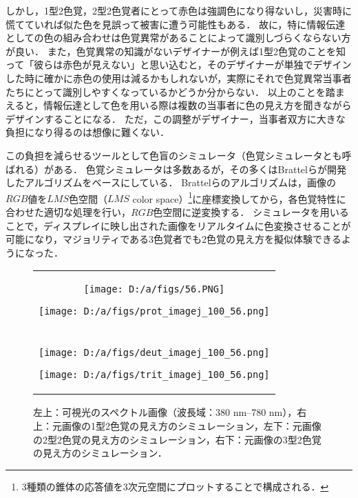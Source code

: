 \documentclass[uplatex,paper=a4,fontsize=4.0truemm,jafontsize=4.0truemm,head_space=30.0truemm,foot_space=30.0truemm,baselineskip=8.0truemm,line_length=40zw,gutter=25.0truemm,oneside,openany,fleqn,hanging_panctuation,open_bracket_pos=nibu_tentsuki,dvipdfmx,jis2004,book,titlepage]{jlreq}
\theoremstyle{mystyle}
\newcommand{\captiondot}[1]{\caption{#1．}}
\newcommand{\mathdisplaystyle}[1]{\(\displaystyle{#1}\)}
\begin{document}
			しかし，1型2色覚，2型2色覚者にとって赤色は強調色になり得ないし，災害時に慌てていれば似た色を見誤って被害に遭う可能性もある．
			故に，特に情報伝達としての色の組み合わせは色覚異常があることによって識別しづらくならない方が良い．
			また，色覚異常の知識がないデザイナーが例えば1型2色覚のことを知って「彼らは赤色が見えない」と思い込むと，そのデザイナーが単独でデザインした時に確かに赤色の使用は減るかもしれないが，実際にそれで色覚異常当事者たちにとって識別しやすくなっているかどうか分からない．
			以上のことを踏まえると，情報伝達として色を用いる際は複数の当事者に色の見え方を聞きながらデザインすることになる．
			ただ，この調整がデザイナー，当事者双方に大きな負担になり得るのは想像に難くない．

			この負担を減らせるツールとして色盲のシミュレータ（色覚シミュレータとも呼ばれる）がある．
			色覚シミュレータは多数あるが，その多くはBrattelらが開発したアルゴリズム\cite{Brettel1997}をベースにしている．
			Brattelらのアルゴリズムは，画像の\mathdisplaystyle{RGB}値を\mathdisplaystyle{LMS}色空間（\mathdisplaystyle{LMS} color space）\footnote{3種類の錐体の応答値を3次元空間にプロットすることで構成される．}に座標変換してから，各色覚特性に合わせた適切な処理を行い，\mathdisplaystyle{RGB}色空間に逆変換する．
			シミュレータを用いることで，ディスプレイに映し出された画像をリアルタイムに色変換させることが可能になり，マジョリティである3色覚者でも2色覚の見え方を擬似体験できるようになった．
			\begin{figure}[tbp]
				\centering
				\begin{tabular}{c}
					\begin{minipage}{0.5\linewidth}
						\centering
						\texttt{[image: D:/a/figs/56.PNG]}
					\end{minipage}
					\begin{minipage}{0.5\linewidth}
						\centering
						\texttt{[image: D:/a/figs/prot\_imagej\_100\_56.png]}
					\end{minipage} \\
					\begin{minipage}{0.06\linewidth}
						\vspace{10truemm}
					\end{minipage} \\
					\begin{minipage}{0.5\linewidth}
						\centering
						\texttt{[image: D:/a/figs/deut\_imagej\_100\_56.png]}
					\end{minipage}
					\begin{minipage}{0.5\linewidth}
						\centering
						\texttt{[image: D:/a/figs/trit\_imagej\_100\_56.png]}
					\end{minipage}
				\end{tabular}
				\captiondot{左上：可視光のスペクトル画像（波長域：380 nm--780 nm），右上：元画像の1型2色覚の見え方のシミュレーション，左下：元画像の2型2色覚の見え方のシミュレーション，右下：元画像の3型2色覚の見え方のシミュレーション}\label{fig:spect}
			\end{figure}
\end{document}
